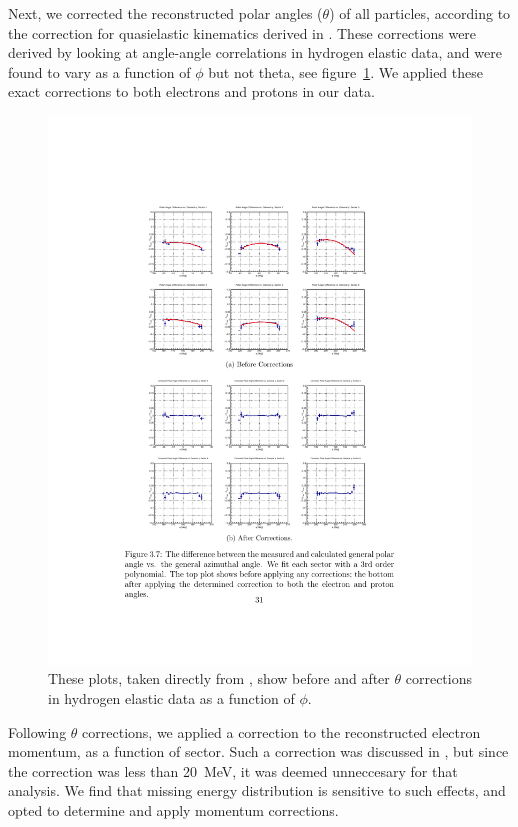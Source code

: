 \documentclass{article}
\begin{document}
Next, we corrected the reconstructed polar angles ($\theta$) of all
particles, according to the correction for quasielastic kinematics derived in 
\cite{Barak:note}. These corrections were derived by looking at angle-angle 
correlations in hydrogen elastic data, and were found to vary as a function
of $\phi$ but not theta, see figure~\ref{fig:theta_corr}. We applied these 
exact corrections to both electrons and protons in our data. 

\begin{figure}[p]
\centering
\includegraphics{barak_theta_corr.pdf} 
\caption{
These plots, taken directly from \cite{Barak:note}, show before and after $\theta$ 
corrections in hydrogen elastic data as a function of $\phi$. 
\label{fig:theta_corr}}
\end{figure}

Following $\theta$ corrections, we applied a correction to the reconstructed electron momentum, as a function
of sector. Such a correction was discussed in \cite{Barak:note}, but since the correction
was less than 20~MeV, it was deemed unneccesary for that analysis. We find that missing
energy distribution is sensitive to such effects, and opted to determine and apply
momentum corrections.
\end{document}
